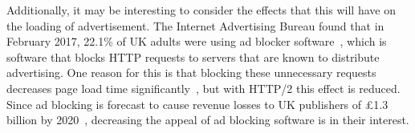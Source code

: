 Additionally, it may be interesting to consider the effects that this will have on the loading of advertisement. The Internet Advertising Bureau found that in February 2017, 22.1\% of UK adults were using ad blocker software~\cite{adblockuk}, which is software that blocks HTTP requests to servers that are known to distribute advertising. One reason for this is that blocking these unnecessary requests decreases page load time significantly~\cite{brave}, but with HTTP/2 this effect is reduced. Since ad blocking is forecast to cause revenue losses to UK publishers of \pounds 1.3 billion by 2020~\cite{adblockrevenue}, decreasing the appeal of ad blocking software is in their interest. 
